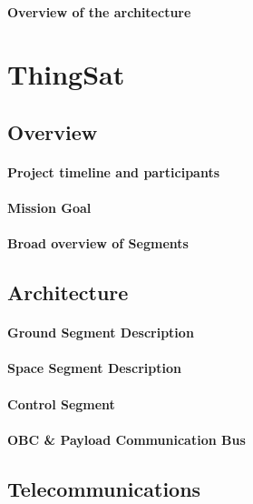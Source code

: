\documentclass[conference]{IEEEtran}
\begin{document}
\paragraph{Overview of the architecture}

\section{ThingSat}
\label{sec:case-study}

\subsection{Overview}

\paragraph*{Project timeline and participants}
\paragraph*{Mission Goal}
\paragraph*{Broad overview of Segments}

\subsection{Architecture}
\paragraph*{Ground Segment Description}
\paragraph*{Space Segment Description}
\paragraph*{Control Segment} %
\paragraph*{OBC \& Payload Communication Bus}

\subsection{Telecommunications}
\end{document}
